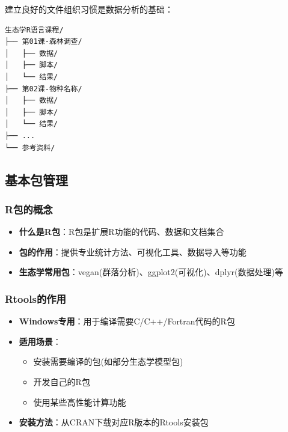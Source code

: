 \documentclass[
]{book}
\providecommand{\tightlist}{%
  \setlength{\itemsep}{0pt}\setlength{\parskip}{0pt}}
\begin{document}
建立良好的文件组织习惯是数据分析的基础：

\begin{verbatim}
生态学R语言课程/
├── 第01课-森林调查/
│   ├── 数据/
│   ├── 脚本/
│   └── 结果/
├── 第02课-物种名称/
│   ├── 数据/
│   ├── 脚本/
│   └── 结果/
├── ...
└── 参考资料/
\end{verbatim}

\hypertarget{ux57faux672cux5305ux7ba1ux7406}{%
\subsection{基本包管理}\label{ux57faux672cux5305ux7ba1ux7406}}

\hypertarget{rux5305ux7684ux6982ux5ff5}{%
\subsubsection{R包的概念}\label{rux5305ux7684ux6982ux5ff5}}

\begin{itemize}
\tightlist
\item
  \textbf{什么是R包}：R包是扩展R功能的代码、数据和文档集合
\item
  \textbf{包的作用}：提供专业统计方法、可视化工具、数据导入等功能
\item
  \textbf{生态学常用包}：vegan(群落分析)、ggplot2(可视化)、dplyr(数据处理)等
\end{itemize}

\hypertarget{rtoolsux7684ux4f5cux7528}{%
\subsubsection{Rtools的作用}\label{rtoolsux7684ux4f5cux7528}}

\begin{itemize}
\tightlist
\item
  \textbf{Windows专用}：用于编译需要C/C++/Fortran代码的R包
\item
  \textbf{适用场景}：

  \begin{itemize}
  \tightlist
  \item
    安装需要编译的包(如部分生态学模型包)
  \item
    开发自己的R包
  \item
    使用某些高性能计算功能
  \end{itemize}
\item
  \textbf{安装方法}：从CRAN下载对应R版本的Rtools安装包
\end{itemize}
\end{document}
